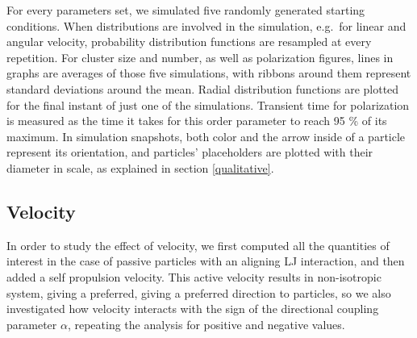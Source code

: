 \documentclass[../../master_thesis_np.tex]{subfiles}
\begin{document}
		For every parameters set, we simulated five randomly generated starting conditions.
		When distributions are involved in the simulation, e.g.\ for linear and angular velocity, probability distribution functions are resampled at every repetition.
		For cluster size and number, as well as polarization figures, lines in graphs are averages of those five simulations, with ribbons around them represent standard deviations around the mean.
		Radial distribution functions are plotted for the final instant of just one of the simulations.
		Transient time for polarization is measured as the time it takes for this order parameter to reach \num{95} \% of its maximum.
		In simulation snapshots, both color and the arrow inside of a particle represent its orientation, and particles' placeholders are plotted with their diameter in scale, as explained in section \ref{qualitative}.
		
		\subsection{Velocity}
		\label{velocity}
		In order to study the effect of velocity, we first computed all the quantities of interest in the case of passive particles with an aligning LJ interaction, and then added a self propulsion velocity. 
		This active velocity results in non-isotropic system, giving a preferred, giving a preferred direction to particles, so we also investigated how velocity interacts with the sign of the directional coupling parameter $\alpha$, repeating the analysis for positive and negative values.
		
\end{document}
